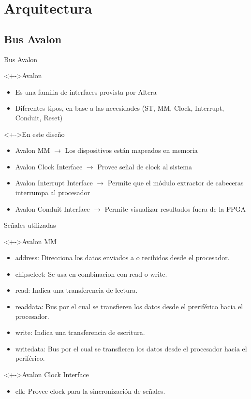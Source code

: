 \documentclass[xcolor=dvipsnames]{beamer}
\begin{document}
\section{Arquitectura}

\subsection{Bus Avalon}
\begin{frame}{Bus Avalon}
  \begin{block}<+->{Avalon}   
    \begin{itemize}
      \scriptsize
     	\item Es una familia de interfaces provista por Altera
	\item Diferentes tipos, en base a las necesidades (ST, MM, Clock, Interrupt, Conduit, Reset)
    \end{itemize}
  \end{block}
\begin{block}<+->{En este diseño}   
    \begin{itemize}
      \scriptsize
     	\item Avalon MM $\rightarrow$ Los dispositivos están mapeados en memoria
	\item Avalon Clock Interface $\rightarrow$ Provee señal de clock al sistema
	\item Avalon Interrupt Interface $\rightarrow$ Permite que el módulo extractor de cabeceras interrumpa al procesador
	\item Avalon Conduit Interface $\rightarrow$ Permite visualizar resultados fuera de la FPGA
    \end{itemize}
  \end{block}
\end{frame}

\begin{frame}{Señales utilizadas}
  \begin{block}<+->{Avalon MM}
  \begin{itemize}
      \scriptsize
	\item address: Direcciona los datos enviados a o recibidos desde el procesador.
	\item chipselect: Se usa en combinacion con read o write.
	\item read: Indica una transferencia de lectura.
	\item readdata: Bus por el cual se transfieren los datos desde el preriférico hacia el procesador.
	\item write: Indica una transferencia de escritura.
	\item writedata: Bus por el cual se transfieren los datos desde el procesador hacia el periférico.
   \end{itemize}
\end{block}	

\begin{block}<+->{Avalon Clock Interface}
  \begin{itemize}
      \scriptsize
	\item clk: Provee clock para la sincronización de señales.	
   \end{itemize}
  \end{block}
\end{frame}
\end{document}
